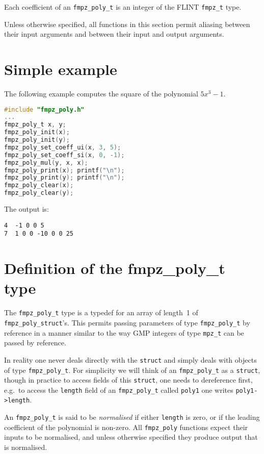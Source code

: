 \documentclass[a4paper,10pt]{book}
\newcommand{\code}{\lstinline}
\begin{document}
Each coefficient of an \code{fmpz_poly_t} is an integer of the FLINT 
\code{fmpz_t} type.

Unless otherwise specified, all functions in this section permit aliasing 
between their input arguments and between their input and output arguments.

\section{Simple example}

The following example computes the square of the polynomial $5x^3 - 1$.

\begin{lstlisting}[language=c]
#include "fmpz_poly.h"
...
fmpz_poly_t x, y;
fmpz_poly_init(x);
fmpz_poly_init(y);
fmpz_poly_set_coeff_ui(x, 3, 5);
fmpz_poly_set_coeff_si(x, 0, -1);
fmpz_poly_mul(y, x, x);
fmpz_poly_print(x); printf("\n");
fmpz_poly_print(y); printf("\n");
fmpz_poly_clear(x);
fmpz_poly_clear(y);
\end{lstlisting}

The output is:

\begin{lstlisting}
4  -1 0 0 5
7  1 0 0 -10 0 0 25
\end{lstlisting}

\section{Definition of the fmpz\_poly\_t type}

The \code{fmpz_poly_t} type is a typedef for an array of length~1 of 
\code{fmpz_poly_struct}'s.  This permits passing parameters of type 
\code{fmpz_poly_t} by reference in a manner similar to the way GMP integers 
of type \code{mpz_t} can be passed by reference. 

In reality one never deals directly with the \code{struct} and simply deals 
with objects of type \code{fmpz_poly_t}.  For simplicity we will think of an 
\code{fmpz_poly_t} as a \code{struct}, though in practice to access fields 
of this \code{struct}, one needs to dereference first, e.g.\ to access the 
\code{length} field of an \code{fmpz_poly_t} called \code{poly1} one writes 
\code{poly1->length}. 

An \code{fmpz_poly_t} is said to be \emph{normalised} if either 
\code{length} is zero, or if the leading coefficient of the polynomial is 
non-zero.  All \code{fmpz_poly} functions expect their inputs to be 
normalised, and unless otherwise specified they produce output that is 
normalised. 
\end{document}

